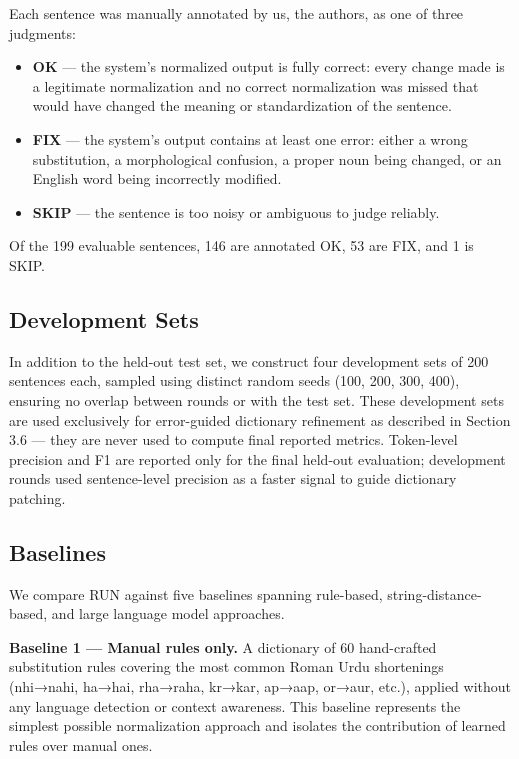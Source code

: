\documentclass[11pt]{article}
\begin{document}
Each sentence was manually annotated by us, the authors, as one of three judgments:
\vspace{-0.3em}
\begin{itemize}
\setlength{\itemsep}{2pt}
\setlength{\parsep}{0pt}
\setlength{\parskip}{0pt}
\setlength{\topsep}{2pt}
    \item \textbf{OK} — the system's normalized output is fully correct: every change made is a legitimate normalization and no correct normalization was missed that would have changed the meaning or standardization of the sentence.
    \item \textbf{FIX} — the system's output contains at least one error: either a wrong substitution, a morphological confusion, a proper noun being changed, or an English word being incorrectly modified.
    \item \textbf{SKIP} — the sentence is too noisy or ambiguous to judge reliably.
\end{itemize}
\vspace{-0.3em}
Of the 199 evaluable sentences, 146 are annotated OK, 53 are FIX, and 1 is SKIP.


\subsection{Development Sets}
In addition to the held-out test set, we construct four development sets of 200 sentences each, sampled using distinct random seeds (100, 200, 300, 400), ensuring no overlap between rounds or with the test set. These development sets are used exclusively for error-guided dictionary refinement as described in Section 3.6 — they are never used to compute final reported metrics. Token-level precision and F1 are reported only for the final held-out evaluation; development rounds used sentence-level precision as a faster signal to guide dictionary patching.

\subsection{Baselines}
We compare RUN against five baselines spanning rule-based, string-distance-based, and large language model approaches.

\textbf{Baseline 1 — Manual rules only.} A dictionary of 60 hand-crafted substitution rules covering the most common Roman Urdu shortenings (nhi→nahi, ha→hai, rha→raha, kr→kar, ap→aap, or→aur, etc.), applied without any language detection or context awareness. This baseline represents the simplest possible normalization approach and isolates the contribution of learned rules over manual ones.
\end{document}
